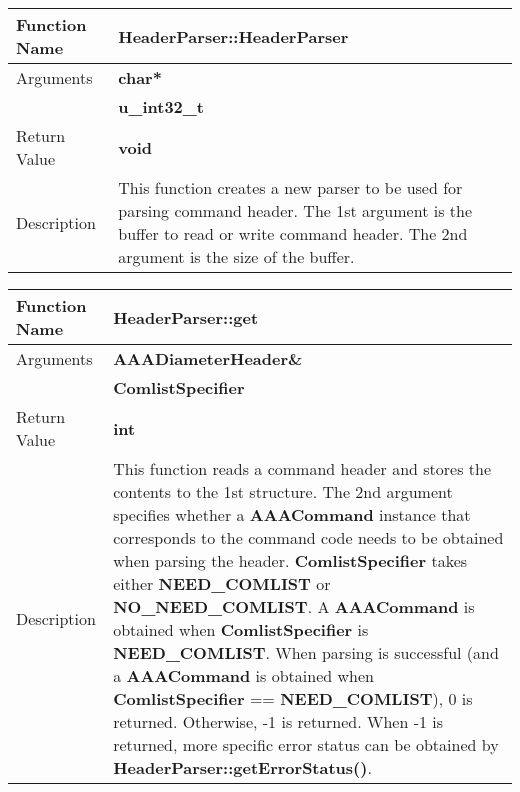 \begin{flushleft}
\begin{tabular}[t]{|l|p{3in}|}\hline
 Function Name & {\bf HeaderParser::HeaderParser}
\\\hline
 Arguments & {\bf char*}
\\\cline{2-2}
           & {\bf u\_int32\_t}
\\\hline
 Return Value & {\bf void}
\\\hline
 Description &  
 This function creates a new parser to be used for parsing command
 header.  The 1st argument is the buffer to read or write command
 header.  The 2nd argument is the size of the buffer.
\\\hline
\end{tabular}
\end{flushleft}
\clearpage

\begin{flushleft}
\begin{tabular}[t]{|l|p{3in}|}\hline
 Function Name & {\bf HeaderParser::get} \\\hline 

 Arguments & {\bf AAADiameterHeader\&} \\\cline{2-2} 
           & {\bf ComlistSpecifier} \\\hline
 Return Value & {\bf int} \\\hline 
 Description & This function reads a
 command header and stores the contents to the 1st structure.  The 2nd
 argument specifies whether a {\bf AAACommand} instance that corresponds
 to the command code needs to be obtained when parsing the header.  {\bf
 ComlistSpecifier} takes either {\bf NEED\_COMLIST} or {\bf
 NO\_NEED\_COMLIST}.  A {\bf AAACommand} is obtained when {\bf
 ComlistSpecifier} is {\bf NEED\_COMLIST}.  When parsing is successful
 (and a {\bf AAACommand} is obtained when {\bf ComlistSpecifier} ==
 {\bf NEED\_COMLIST}), 0 is returned.  Otherwise, -1 is returned.
 When -1 is returned, more specific error status can be obtained by 
 {\bf HeaderParser::getErrorStatus()}.
\\\hline
\end{tabular}
\end{flushleft}

